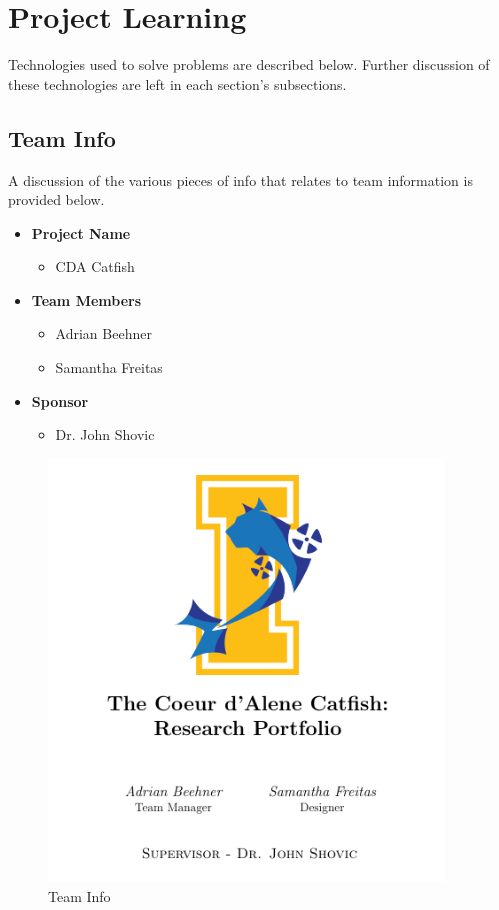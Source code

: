 \documentclass[12pt]{article}
\begin{document}
	\section{Project Learning}
	Technologies used to solve problems are described below. Further discussion of these technologies are left in each section's subsections.
	
		\subsection{Team Info}
		A discussion of the various pieces of info that relates to team information is provided below.
		
		{\renewcommand\labelitemi{}
			\begin{itemize}
				\item \textbf{Project Name}
				\begin{itemize}
					\item CDA Catfish
				\end{itemize}
				\item \textbf{Team Members}
				\begin{itemize}
					\item Adrian Beehner
					\item Samantha Freitas
				\end{itemize}
				\item \textbf{Sponsor}
				\begin{itemize}
					\item Dr. John Shovic
				\end{itemize}
			\end{itemize}
		
		\begin{figure}[!htb]
			\centering
			\includegraphics[width=105mm]{assets/Team_Info.png}
			\caption{Team Info \label{overflow}}
		\end{figure}
		
}
\end{document}
